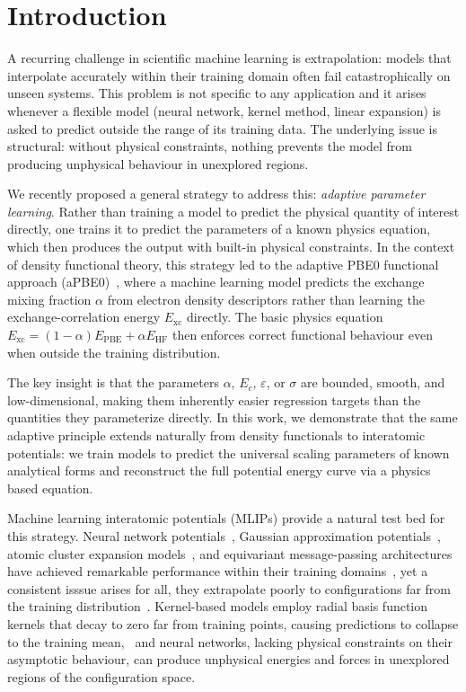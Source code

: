 \documentclass[aps,prb,twocolumn,superscriptaddress,longbibliography,floatfix]{revtex4-2}
\begin{document}
\section{Introduction}
\label{sec:intro}

A recurring challenge in scientific machine learning is extrapolation: models that interpolate accurately within their training domain often fail catastrophically on unseen systems. This problem is not specific to any application and it arises whenever a flexible model (neural network, kernel method, linear expansion) is asked to predict outside the range of its training data. The underlying issue is structural: without physical constraints, nothing prevents the model from producing unphysical behaviour in unexplored regions.

We recently proposed a general strategy to address this: \emph{adaptive parameter learning}. Rather than training a model to predict the physical quantity of interest directly, one trains it to predict the parameters of a known physics equation, which then produces the output with built-in physical constraints. In the context of density functional theory, this strategy led to the adaptive PBE0 functional approach (aPBE0)~\cite{Khan2025}, where a machine learning model predicts the exchange mixing fraction $\alpha$ from electron density descriptors rather than learning the exchange-correlation energy $E_\mathrm{xc}$ directly. The basic physics equation $E_\mathrm{xc} = (1-\alpha)E_\mathrm{PBE} + \alpha E_\mathrm{HF}$ then enforces correct functional behaviour even when outside the training distribution.

The key insight is that the parameters $\alpha$, $E_c$, $\varepsilon$, or $\sigma$ are bounded, smooth, and low-dimensional, making them inherently easier regression targets than the quantities they parameterize directly. In this work, we demonstrate that the same adaptive principle extends naturally from density functionals to interatomic potentials: we train models to predict the universal scaling parameters of known analytical forms and reconstruct the full potential energy curve via a physics based equation.

Machine learning interatomic potentials (MLIPs) provide a natural test bed for this strategy. Neural network potentials~\cite{Behler2007,Smith2017}, Gaussian approximation potentials~\cite{Bartok2010,Deringer2019}, atomic cluster expansion models~\cite{Drautz2019}, and equivariant message-passing architectures~\cite{Batatia2022} have achieved remarkable performance within their training domains~\cite{Unke2021}, yet a consistent isssue arises for all, they extrapolate poorly to configurations far from the training distribution~\cite{Zuo2020,Noe2020}. Kernel-based models employ radial basis function kernels that decay to zero far from training points, causing predictions to collapse to the training mean,~\cite{Bartok2010} and neural networks, lacking physical constraints on their asymptotic behaviour, can produce unphysical energies and forces in unexplored regions of the configuration space.
\end{document}
